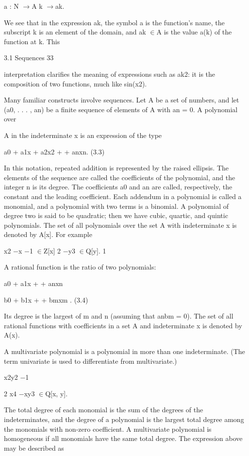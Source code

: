 \documentclass[11pt]{article}
\theoremstyle{plain}
\theoremstyle{definition}
\begin{document}
a : N $\to$A k $\to$ak.

We see that in the expression ak, the symbol a is the function's name, the subscript k is an element of the domain, and ak $\in$A is the value a(k) of the function at k. This

3.1 Sequences 33

interpretation clarifies the meaning of expressions such as ak2: it is the composition of two functions, much like sin(x2).

Many familiar constructs involve sequences. Let A be a set of numbers, and let (a0, . . . , an) be a finite sequence of elements of A with an = 0. A polynomial over

A in the indeterminate x is an expression of the type

a0 + a1x + a2x2 + \textperiodcentered{} \textperiodcentered{} \textperiodcentered{} + anxn. (3.3)

In this notation, repeated addition is represented by the raised ellipsis. The elements of the sequence are called the coefficients of the polynomial, and the integer n is its degree. The coefficients a0 and an are called, respectively, the constant and the leading coefficient. Each addendum in a polynomial is called a monomial, and a polynomial with two terms is a binomial. A polynomial of degree two is said to be quadratic; then we have cubic, quartic, and quintic polynomials. The set of all polynomials over the set A with indeterminate x is denoted by A[x]. For example

x2 $-$x $-$1 $\in$Z[x] 2 $-$y3 $\in$Q[y]. 1

A rational function is the ratio of two polynomials:

a0 + a1x + \textperiodcentered{} \textperiodcentered{} \textperiodcentered{} + anxn

b0 + b1x + \textperiodcentered{} \textperiodcentered{} \textperiodcentered{} + bmxm . (3.4)

Its degree is the largest of m and n (assuming that anbm = 0). The set of all rational functions with coefficients in a set A and indeterminate x is denoted by A(x).

A multivariate polynomial is a polynomial in more than one indeterminate. (The term univariate is used to differentiate from multivariate.)

x2y2 $-$1

2 x4 $-$xy3 $\in$Q[x, y].

The total degree of each monomial is the sum of the degrees of the indeterminates, and the degree of a polynomial is the largest total degree among the monomials with non-zero coefficient. A multivariate polynomial is homogeneous if all monomials have the same total degree. The expression above may be described as
\end{document}
